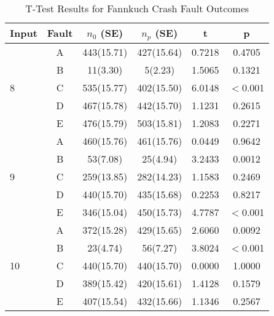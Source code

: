 \begin{table}[htbp]
\small{
\begin{center}
    \begin{tabular}{|p{0.7cm}|c|c|c|c|c|}
    \hline
    \textbf{Input} & \textbf{Fault} & \textbf{$n_0$ (SE)} & \textbf{$n_p$ (SE)} & \textbf{t} & \textbf{p} \\ \hline
    \multirow{5}{*}{8}
    & A & 443(15.71) & 427(15.64) & 0.7218 & 0.4705 \\
	& B & 11(3.30) & 5(2.23) & 1.5065 & 0.1321 \\
 	& C & 535(15.77) & 402(15.50) & 6.0148 & $<$0.001 \\
 	& D & 467(15.78) & 442(15.70) & 1.1231 & 0.2615 \\
 	& E & 476(15.79) & 503(15.81) & 1.2083 & 0.2271 \\ \hline
    \multirow{5}{*}{9}
    & A & 460(15.76) & 461(15.76) & 0.0449 & 0.9642 \\
	& B & 53(7.08) & 25(4.94) & 3.2433 & 0.0012 \\
 	& C & 259(13.85) & 282(14.23) & 1.1583 & 0.2469 \\
 	& D & 440(15.70) & 435(15.68) & 0.2253 & 0.8217 \\
 	& E & 346(15.04) & 450(15.73) & 4.7787 & $<$0.001 \\ \hline
 	\multirow{5}{*}{10}
    & A & 372(15.28) & 429(15.65) & 2.6060 & 0.0092 \\
	& B & 23(4.74) & 56(7.27) & 3.8024 & $<$0.001 \\
 	& C & 440(15.70) & 440(15.70) & 0.0000 & 1.0000 \\
 	& D & 389(15.42) & 420(15.61) & 1.4128 & 0.1579 \\
 	& E & 407(15.54) & 432(15.66) & 1.1346 & 0.2567 \\ \hline
    \hline
    \end{tabular}
    \end{center}
    }
    \caption{T-Test Results for Fannkuch Crash Fault Outcomes}
    \label{tab:Fannkuch_Crash_TTest}
\end{table}

